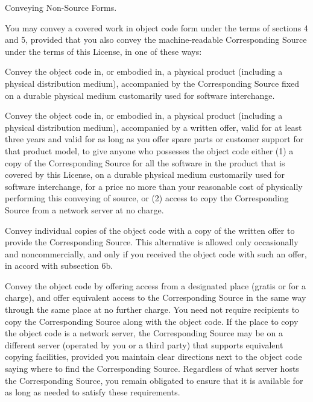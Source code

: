 \item Conveying Non-Source Forms.

You may convey a covered work in object code form under the terms of sections 4 and 5, provided that you also convey the machine-readable Corresponding Source under the terms of this License, in one of these ways:
  \startitemize[n][]
  \item Convey the object code in, or embodied in, a physical product (including a physical distribution medium), accompanied by the Corresponding Source fixed on a durable physical medium customarily used for software interchange.

  \item Convey the object code in, or embodied in, a physical product (including a physical distribution medium), accompanied by a written offer, valid for at least three years and valid for as long as you offer spare parts or customer support for that product model, to give anyone who possesses the object code either (1) a copy of the Corresponding Source for all the software in the product that is covered by this License, on a durable physical medium customarily used for software interchange, for a price no more than your reasonable cost of physically performing this conveying of source, or (2) access to copy the Corresponding Source from a network server at no charge.

  \item Convey individual copies of the object code with a copy of the written offer to provide the Corresponding Source.  This alternative is allowed only occasionally and noncommercially, and only if you received the object code with such an offer, in accord with subsection 6b.

  \item Convey the object code by offering access from a designated place (gratis or for a charge), and offer equivalent access to the Corresponding Source in the same way through the same place at no further charge.  You need not require recipients to copy the Corresponding Source along with the object code.  If the place to copy the object code is a network server, the Corresponding Source may be on a different server (operated by you or a third party) that supports equivalent copying facilities, provided you maintain clear directions next to the object code saying where to find the Corresponding Source.  Regardless of what server hosts the Corresponding Source, you remain obligated to ensure that it is available for as long as needed to satisfy these requirements.

